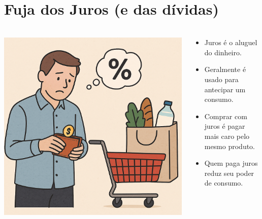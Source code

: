 \section{Fuja dos Juros (e das dívidas)} \label{FormProb}

\begin{frame}[c]
    \frametitle{}
    \begin{columns}
        \begin{column}{0.5\textwidth}
            \includegraphics[width=\textwidth]{../figuras/consumo2.png}
        \end{column}
        \begin{column}{0.5\textwidth}
            \centering
            \begin{itemize}
                \item Juros é o aluguel do dinheiro.
                \item Geralmente é usado para antecipar um consumo.
                \item Comprar com juros é pagar mais caro pelo mesmo produto.
                \item Quem paga juros reduz seu poder de consumo.
            \end{itemize}
        \end{column}
    \end{columns}
\end{frame}

